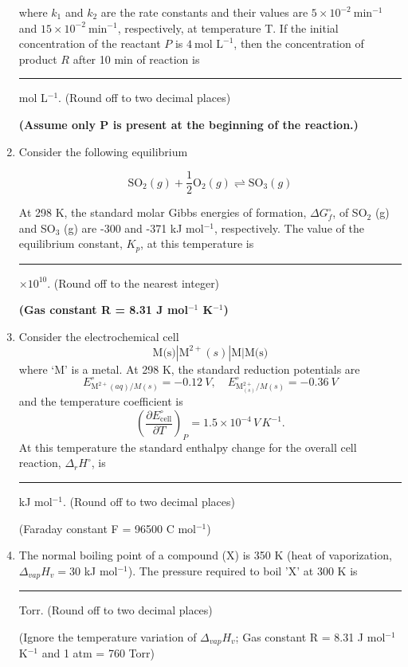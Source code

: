 \documentclass[journal,12pt,onecolumn]{IEEEtran}
\theoremstyle{remark}
\begin{document}
\begin{enumerate}
\noindent where \(k_1\) and \(k_2\) are the rate constants and their values are \(5 \times 10^{-2}~\text{min}^{-1}\) and \(15 \times 10^{-2}~\text{min}^{-1}\), respectively, at temperature T. If the initial concentration of the reactant \(P\) is \(4~\text{mol L}^{-1}\), then the concentration of product \(R\) after 10 min of reaction is \rule{2cm}{0.15mm} mol L\(^{-1}\). (Round off to two decimal places)

\textbf{(Assume only P is present at the beginning of the reaction.)}

\item Consider the following equilibrium \hfill{}

\[
\text{SO}_2 (g) + \frac{1}{2} \text{O}_2 (g) \rightleftharpoons \text{SO}_3 (g)
\]

At 298 K, the standard molar Gibbs energies of formation, \(\Delta G_f^\circ\), of SO\(_2\) (g) and SO\(_3\) (g) are -300 and -371 kJ mol\(^{-1}\), respectively. The value of the equilibrium constant, \(K_p\), at this temperature is \rule{2cm}{0.15mm} \(\times 10^{10}\). (Round off to the nearest integer)

\textbf{(Gas constant R = 8.31 J mol\(^{-1}\) K\(^{-1}\))}




\item Consider the electrochemical cell
\[
\text{M(s)}|\text{M}^{2+}(s)|\text{M}|\text{M(s)}
\]
where `M' is a metal. At 298 K, the standard reduction potentials are 
\[
E^\circ_{\text{M}^{2+}(aq)/M(s)} = -0.12~V, \quad
E^\circ_{\text{M}^{2+}_{(s)}/M(s)} = -0.36~V
\]
and the temperature coefficient is
\[
\left(\frac{\partial E^\circ_{\text{cell}}}{\partial T}\right)_P = 1.5 \times 10^{-4} \, V\,K^{-1}.
\]
At this temperature the standard enthalpy change for the overall cell reaction, \(\Delta_r H^\circ\), is \rule{2cm}{0.15mm} kJ mol\(^{-1}\). (Round off to two decimal places)

(Faraday constant F = 96500 C mol\(^{-1}\))

\item The normal boiling point of a compound (X) is 350 K (heat of vaporization, \(\Delta_{vap}H_v = 30\) kJ mol\(^{-1}\)). The pressure required to boil 'X' at 300 K is \rule{2cm}{0.15mm} Torr. (Round off to two decimal places)

(Ignore the temperature variation of \(\Delta_{vap}H_v\); Gas constant R = 8.31 J mol\(^{-1}\) K\(^{-1}\) and 1 atm = 760 Torr)


\end{enumerate}
\end{document}
